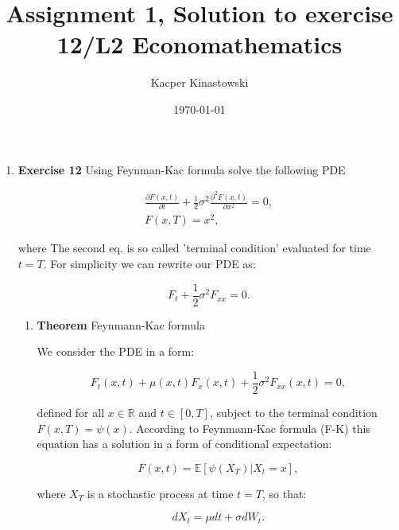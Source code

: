 \documentclass[12pt]{article}
\title{Assignment 1, Solution to exercise 12/L2 Economathematics}
\author{Kacper Kinastowski}
\date{\today}
\begin{document}
\maketitle
\begin{enumerate}[leftmargin=\labelsep]
\item \textbf{Exercise 12 } Using Feynman-Kac formula solve the following PDE

\begin{equation}
\begin{split}\label{pde}
    \frac{\partial F(x,t)}{\partial t} + \frac{1}{2} \sigma ^ 2 \frac{\partial ^ 2 F(x,t)}{\partial x^2} = 0, \\
    F(x,T) = x^2,
\end{split}
\end{equation}

where The second eq. is so called 'terminal condition' evaluated for time $t = T$. For simplicity we can rewrite our PDE as:

\begin{equation}
    F_t + \frac{1}{2} \sigma ^ 2 F_{xx} = 0.
\end{equation}




    \begin{enumerate}
    \item \textbf{Theorem} Feynmann-Kac formula

        We consider the PDE in a form:
    
        \begin{equation}
            F_t(x,t) + \mu (x,t) F_x (x,t) + \frac{1}{2} \sigma ^2 F_{xx}(x,t) = 0,
        \end{equation}
        
        defined for all $x \in \mathbb{R}$ and $t \in [0, T]$, subject to the terminal condition $F(x,T) = \psi(x)$. According to Feynmann-Kac formula (F-K) this equation has a solution in a form of conditional expectation:
        
        \begin{equation}\label{exp}
            F(x,t) = \mathbb{E} \left[ \psi(X_T) | X_t = x\right],
        \end{equation}
        
        where $X_T$ is a stochastic process at time $t = T$, so that:
        
        \begin{equation}\label{ito}
            d X_t = \mu dt + \sigma dW_t.
        \end{equation}
        

\end{enumerate}
\end{enumerate}
\end{document}
